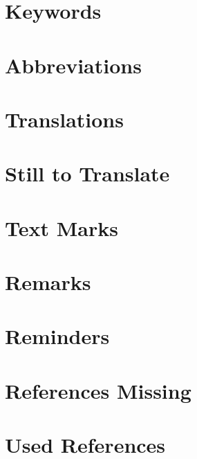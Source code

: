 %
\placeAll%
{%
\section{Keywords}%
\placeRegKeyword%
%
\section{Abbreviations}%
\placelistofRegAbbreviations%
%
\section{Translations}%
\placeTranslationsAll%
%
\section{Still to Translate}%
\placeUndefinedTranslationsAll%
%
\section{Text Marks}%
\placeTextMarksAll%
%
\section{Remarks}%
\placeRemarksAll%
%
\section{Reminders}%
\placeRemindersAll%
%
\section{References Missing}%
\placeMissingReferencesAll%
%
\section{Used References}%
\placeQuotesAll%
%
\placeReferences%
}

